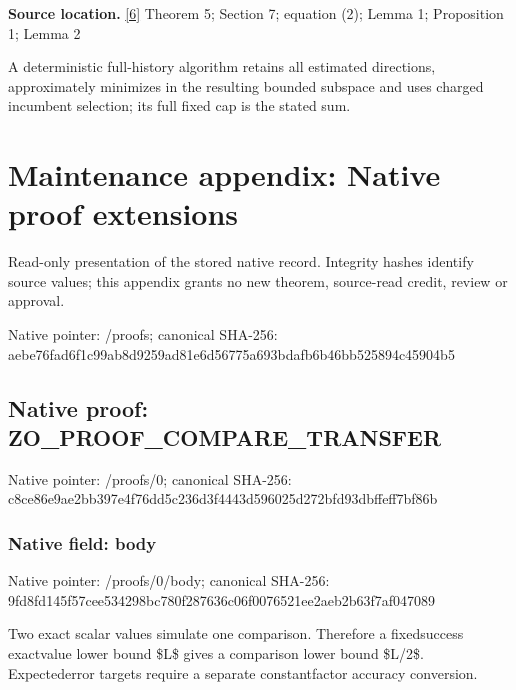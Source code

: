 \documentclass[10pt,a4paper]{article}
\begin{document}
\textbf{Source location.} \href{https://github.com/WU-Wendao/Colombo/blob/main/colombo_sensorium/Complexity_altas/data/sources/colombo/COLOMBO_KIMI_002/kimi_002.pdf}{[6]} Theorem 5; Section 7; equation (2); Lemma 1; Proposition 1; Lemma 2



A deterministic full-history algorithm retains all estimated directions, approximately minimizes in the resulting bounded subspace and uses charged incumbent selection; its full fixed cap is the stated sum.



\section{Maintenance appendix: Native proof extensions}


Read-only presentation of the stored native record. Integrity hashes identify source values; this appendix grants no new theorem, source-read credit, review or approval.



Native pointer: /proofs; canonical SHA-256: aebe76fad6f1c99ab8d9259a\allowbreak{}d81e6d56775a693bdafb6b46\allowbreak{}bb525894c45904b5



\subsection{Native proof: ZO\_PROOF\_COMPARE\_TRANSFER}


Native pointer: /proofs/0; canonical SHA-256: c8ce86e9ae2bb397e4f76dd5\allowbreak{}c236d3f4443d596025d272bf\allowbreak{}d93dbffeff7bf86b



\subsubsection{Native field: body}


Native pointer: /proofs/0/body; canonical SHA-256: 9fd8fd145f57cee534298bc7\allowbreak{}80f287636c06f0076521ee2a\allowbreak{}eb2b63f7af047089


Two exact scalar values simulate one comparison. Therefore a fixedsuccess exactvalue lower bound \$L\$ gives a comparison lower bound \$L/2\$. Expectederror targets require a separate constantfactor accuracy conversion.
\end{document}

